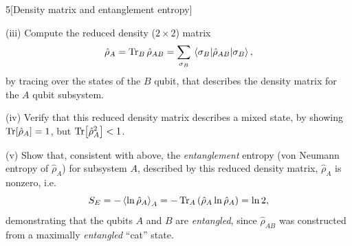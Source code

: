 \documentclass[12pt]{article}
\begin{document}
\begin{problem}{5}[Density matrix and entanglement entropy]
\begin{solution}
\end{solution}

\qquad(iii) Compute the reduced density ($2\times2$) matrix
\begin{equation}
    \hat\rho_A=\Tr_B\hat\rho_{AB}=\sum_{\sigma_B}\ev{\hat\rho_{AB}}{\sigma_B}, 
\end{equation}
by tracing over the states of the $B$ qubit, that describes the density matrix
for the $A$ qubit subsystem.
\begin{solution}
    
\end{solution}

\qquad(iv) Verify that this reduced density matrix describes a mixed state, by
showing $\Tr[\hat\rho_A]=1$, but $\Tr[\hat\rho_A^2]<1$.
\begin{solution}
    
\end{solution}

\qquad(v) Show that, consistent with above, the \textit{entanglement} entropy
(von Neumann entropy of $\hat\rho_A$) for subsystem $A$, described by this
reduced density matrix, $\hat\rho_A$ is nonzero, i.e.
\begin{equation}
    S_E=-\expval{\ln\hat\rho_A}_A=-\Tr_A\qty(\hat\rho_A\ln\hat\rho_A)=\ln 2, 
\end{equation}
demonstrating that the qubits $A$ and $B$ are \textit{entangled}, since
$\hat\rho_{AB}$ was constructed from a maximally \textit{entangled} ``cat''
state.
\end{problem}
\newpage
    
\end{document}

